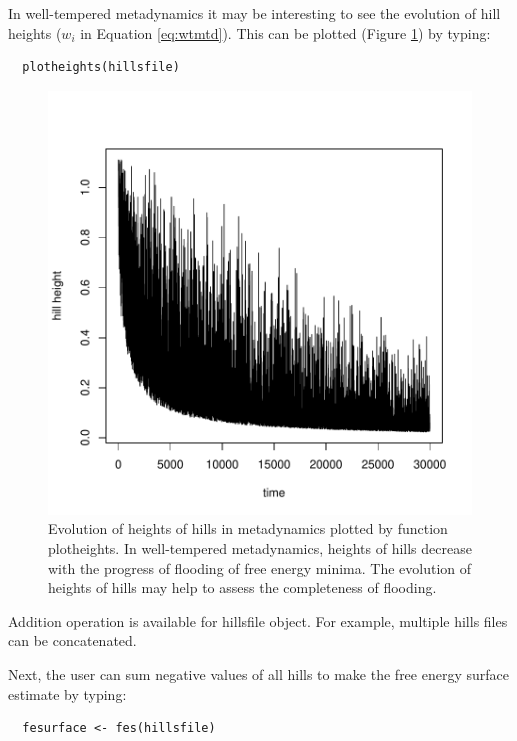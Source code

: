 In well-tempered metadynamics it may be interesting to see the evolution
of hill heights (\(w_i\) in Equation \eqref{eq:wtmtd}). This can be
plotted (Figure \ref{fig:plotheights}) by typing:

\begin{verbatim}
  plotheights(hillsfile)
\end{verbatim}

\begin{Schunk}
\begin{figure}

{\centering \includegraphics[width=0.8\linewidth]{metadynminer_files/figure-latex/plotheights-1} 

}

\caption[Evolution of heights of hills in metadynamics plotted by function plotheights]{Evolution of heights of hills in metadynamics plotted by function plotheights. In well-tempered metadynamics, heights of hills decrease with the progress of flooding of free energy minima. The evolution of heights of hills may help to assess the completeness of flooding.}\label{fig:plotheights}
\end{figure}
\end{Schunk}

Addition operation is available for hillsfile object. For example,
multiple hills files can be concatenated.

Next, the user can sum negative values of all hills to make the free
energy surface estimate by typing:

\begin{verbatim}
  fesurface <- fes(hillsfile)
\end{verbatim}

